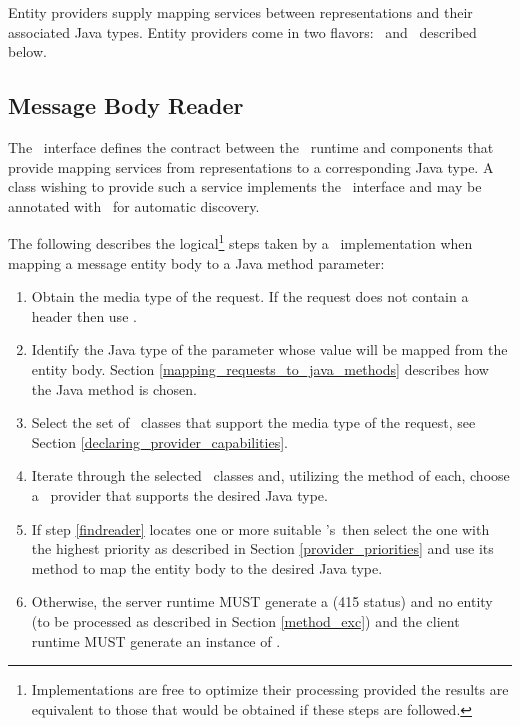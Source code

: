Entity providers supply mapping services between representations and their associated Java types. Entity providers come in two flavors: \MsgRead\ and \MsgWrite\ described below. 

\subsection{Message Body Reader}
\label{message_body_reader}

The \MsgRead\ interface defines the contract between the \jaxrs\ runtime and components that provide mapping services from representations to a corresponding Java type. A class wishing to provide such a service implements the \MsgRead\ interface and may be annotated with \Provider\ for automatic discovery.

The following describes the logical\footnote{Implementations are free to optimize their processing provided the results are equivalent to those that would be obtained if these steps are followed.} steps taken by a \jaxrs\ implementation when mapping a message entity body to a Java method parameter:

\begin{enumerate}
\item Obtain the media type of the request. If the request does not contain a  header then use .
\item Identify the Java type of the parameter whose value will be mapped from the entity body. Section \ref{mapping_requests_to_java_methods} describes how the Java method is chosen.
\item Select the set of \MsgRead\ classes that support the media type of the request, see Section \ref{declaring_provider_capabilities}.
\item\label{findreader} Iterate through the selected \MsgRead\ classes and, utilizing the  method of each, choose a \MsgRead\ provider that supports the desired Java type.
\item If step \ref{findreader} locates one or more suitable \MsgRead's\ then select the one with the highest priority as described in Section \ref{provider_priorities} and use its  method to map the entity body to the desired Java type.
\item Otherwise, the server runtime MUST generate a  (415 status) and no entity (to be processed as described in Section \ref{method_exc}) and the client runtime MUST generate an instance of .
\end{enumerate}

